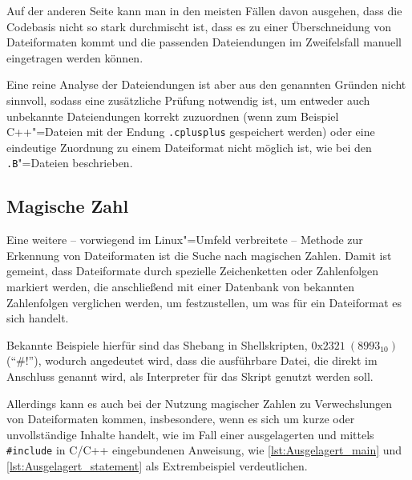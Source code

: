             Auf der anderen Seite kann man in den meisten Fällen davon ausgehen,
            dass die Codebasis nicht so stark durchmischt ist,
            dass es zu einer Überschneidung von Dateiformaten kommt und
            die passenden Dateiendungen im Zweifelsfall manuell eingetragen werden können.

            Eine reine Analyse der Dateiendungen ist aber aus den genannten Gründen nicht sinnvoll,
            sodass eine zusätzliche Prüfung notwendig ist,
            um entweder auch unbekannte Dateiendungen korrekt zuzuordnen
            (wenn zum Beispiel C++"=Dateien mit der Endung
            \lstinline{.cplusplus} gespeichert werden) oder
            eine eindeutige Zuordnung zu einem Dateiformat nicht möglich ist,
            wie bei den
            \lstinline{.B}"=Dateien beschrieben.

        \subsection{Magische Zahl}\label{Magische Zahl}
            Eine weitere
            -- vorwiegend im Linux"=Umfeld verbreitete
            -- Methode zur Erkennung von Dateiformaten ist die Suche nach magischen Zahlen.
            Damit ist gemeint,
            dass Dateiformate durch spezielle Zeichenketten oder
            Zahlenfolgen markiert werden,
            die anschließend mit einer Datenbank von bekannten Zahlenfolgen verglichen werden,
            um festzustellen,
            um was für ein Dateiformat es sich handelt.

            Bekannte Beispiele hierfür sind das Shebang in Shellskripten,
            \( 0\textrm{x}2321\ (8993_{10}) \)
            (\enquote{\#!}),
            wodurch angedeutet wird,
            dass die ausführbare Datei,
            die direkt im Anschluss genannt wird,
            als Interpreter für das Skript genutzt werden soll.

            Allerdings kann es auch bei der Nutzung magischer Zahlen zu Verwechslungen von Dateiformaten kommen,
            insbesondere,
            wenn es sich um kurze oder
            unvollständige Inhalte handelt,
            wie im Fall einer ausgelagerten und
            mittels
            \lstinline{#include} in C/C++ eingebundenen Anweisung,
            wie
            \vref{lst:Ausgelagert_main} und
            \vref{lst:Ausgelagert_statement} als Extrembeispiel verdeutlichen.

            

